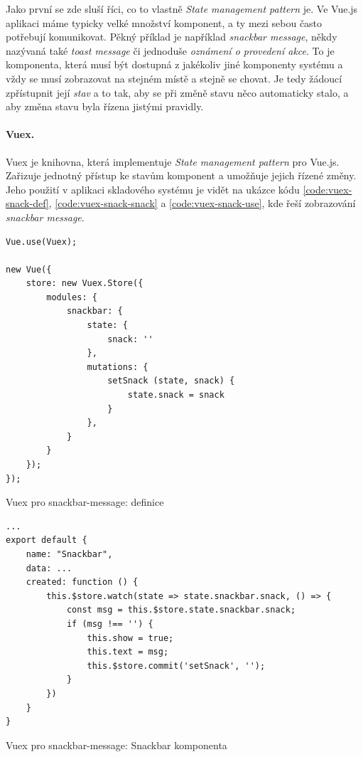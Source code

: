 Jako první se zde sluší říci, co to vlastně \emph{State management pattern} je. Ve Vue.js aplikaci máme typicky velké množství komponent, a ty mezi sebou často potřebují komunikovat. Pěkný příklad je například \emph{snackbar message}, někdy nazývaná také \emph{toast message} či jednoduše \emph{oznámení o provedení akce}. To je komponenta, která musí být dostupná z jakékoliv jiné komponenty systému a vždy se musí zobrazovat na stejném místě a stejně se chovat. Je tedy žádoucí zpřístupnit její \emph{stav} a to tak, aby se při změně stavu něco automaticky stalo, a aby změna stavu byla řízena jistými pravidly.

\paragraph{Vuex.} Vuex \cite{vuex} je knihovna, která implementuje \emph{State management pattern} pro Vue.js. Zařizuje jednotný přístup ke stavům komponent a umožňuje jejich řízené změny. Jeho použití v aplikaci skladového systému je vidět na ukázce kódu \ref{code:vuex-snack-def}, \ref{code:vuex-snack-snack} a \ref{code:vuex-snack-use}, kde řeší zobrazování \emph{snackbar message}.

\begin{listing}[h]
\begin{verbatim}
Vue.use(Vuex);

new Vue({
    store: new Vuex.Store({
        modules: {
            snackbar: {
                state: {
                    snack: ''
                },
                mutations: {
                    setSnack (state, snack) {
                        state.snack = snack
                    }
                },
            }
        }
    });
});
\end{verbatim}
\caption{Vuex pro snackbar-message: definice} \label{code:vuex-snack-def}
\end{listing}

\begin{listing}[h]
\begin{verbatim}
...
export default {
    name: "Snackbar",
    data: ...
    created: function () {
        this.$store.watch(state => state.snackbar.snack, () => {
            const msg = this.$store.state.snackbar.snack;
            if (msg !== '') {
                this.show = true;
                this.text = msg;
                this.$store.commit('setSnack', '');
            }
        })
    }
}
\end{verbatim}
\caption{Vuex pro snackbar-message: Snackbar komponenta} \label{code:vuex-snack-snack}
\end{listing}

